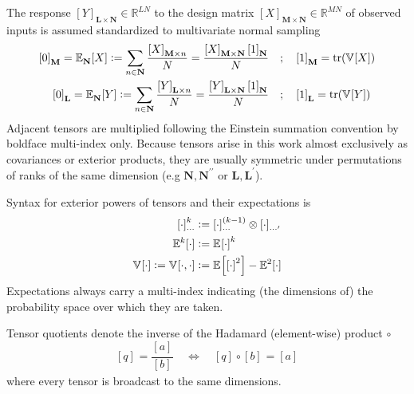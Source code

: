 \documentclass[preprint,12pt]{elsarticle}
\newcommand*{\M}[1]{\ensuremath{#1}\xspace}
\newcommand*{\x}{\times}
\newcommand*{\mi}[1]{\mathbf{#1}}
\newcommand*{\st}[1]{\mathbb{#1}}
\newcommand*{\te}[2][]{\left\lbrack{#2}\right\rbrack_{#1}}
\newcommand*{\deq}{\M{\mathrel{\mathop:}=}}
\newcommand{\T}[1]{\text{#1}}
\newcommand*{\QT}[2][]{\M{\quad\T{#2}\ifthenelse{\equal{#1}{}}{\quad}{#1}}}
\newcommand*{\ev}[3][]{\mathbb{E}_{#3}^{#1}\!\left\lbrack{#2}\right\rbrack}
\newcommand*{\cov}[3][]{\ifthenelse{\equal{#1}{}}{\mathbb{V}_{#3}\!\left\lbrack{#2}\right\rbrack}{\mathbb{V}_{#3}\!\left\lbrack{#2,#1}\right\rbrack}}
\DeclareMathOperator*{\trace}{tr\!}
\begin{document}
    The response $\te[\mi{L}\x\mi{N}]{Y}\in \st{R}^{LN}$ to the design matrix $\te[\mi{M}\x\mi{N}]{X}\in\st{R}^{MN}$ of observed inputs is assumed standardized to multivariate normal sampling
    \begin{equation*}
        \begin{aligned}
            \te[\mi{M}]{0} = \ev{X}{\mi{N}} 
            \deq \sum_{n \in \mi{N}} \frac{\te[\mi{M}\x n]{X}}{N}
            = \frac{\te[\mi{M}\x\mi{N}]{X} \te[\mi{N}]{1}}{N}
            &\QT{;} \te[\mi{M}]{1} = \trace\left(\cov{X}{}\right)
            \\
            \te[\mi{L}]{0} = \ev{Y}{\mi{N}}  
            \deq \sum_{n \in \mi{N}} \frac{\te[\mi{L} \times n]{Y}}{N}
            = \frac{\te[\mi{L}\x\mi{N}]{Y} \te[\mi{N}]{1}}{N}
            &\QT{;} \te[\mi{L}]{1} = \trace\left(\cov{Y}{}\right)
        \end{aligned}                
    \end{equation*}
    Adjacent tensors are multiplied following the Einstein summation convention by boldface multi-index only. 
    Because tensors arise in this work almost exclusively as covariances or exterior products, they are usually symmetric under permutations of ranks of the same dimension (e.g $\mi{N},\mi{N^{\prime\prime}}$ or $\mi{L},\mi{L^{\prime}}$).

    Syntax for exterior powers of tensors and their expectations is
    \begin{equation*}
        \begin{aligned}
            \te[\cdots]{\cdot}^k &\deq 
            \te[\cdots]{\cdot}^{(k-1)} \otimes \te[\cdots^{\prime}]{\cdot} \\
            \ev[k]{\cdot}{} &\deq \ev{\cdot}{}^{k} \\
            \cov{\cdot}{} \deq \cov[\cdot]{\cdot}{} &\deq \ev{\te{\cdot}^2}{} - \ev[2]{\cdot}{}
        \end{aligned}
    \end{equation*}
    Expectations always carry a multi-index indicating (the dimensions of) the probability space over which they are taken.

    Tensor quotients denote the inverse of the Hadamard (element-wise) product $\circ$
    \begin{equation*}
        \te{q} = \frac{\te{a}}{\te{b}} \quad \Longleftrightarrow \quad {\te{q}} \circ {\te{b}} = {\te{a}}
    \end{equation*}
    where every tensor is broadcast to the same dimensions.
\end{document}
